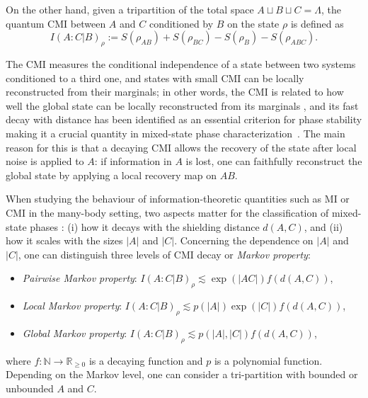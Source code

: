 \documentclass[11pt]{article}
\numberwithin{equation}{section}
\numberwithin{figure}{section}
\numberwithin{table}{section}
\theoremstyle{definition}
\theoremstyle{plain}
\theoremstyle{remark}
\newcommand{\La}{\Lambda}
\newcommand{\abs}[1]{\left \vert#1\right\vert}
\begin{document}
On the other hand, given a tripartition of the total space $A\sqcup B\sqcup C=\La$, the quantum CMI between $A$ and $C$ conditioned by $B$ on the state $\rho$ is defined as
\begin{equation}
    I(A:C|B)_\rho:=S(\rho_{AB})+S(\rho_{BC})-S(\rho_B) - S(\rho_{ABC}).
\end{equation}

The CMI measures the conditional independence of a state between two systems conditioned to a third one, and states with small CMI can be locally reconstructed from their marginals; in other words, the CMI is related to how well the global state can be locally reconstructed from its marginals \cite{Sutter2018,FawRen15}, and its fast decay with distance has been identified as an essential criterion for phase stability making it a crucial quantity in mixed-state phase characterization~\cite{Sang_2025, MKS25, yi2025universaldecayconditionalmutual, chen_quantum_2025, li_unified_2026, chen2026localreversibilitydivergentmarkov}.
The main reason for this is that a decaying CMI allows the recovery of the state after local noise is applied to $A$: if information in $A$ is lost, one can faithfully reconstruct the global state by applying a local recovery map on $AB$. 


 When studying the behaviour of information-theoretic quantities such as MI or CMI in the many-body setting, two aspects matter for the classification of mixed-state phases \cite{yi2025universaldecayconditionalmutual,ma2025circuitbasedcharacterizationfinitetemperaturequantum}: (i) how it decays with the shielding distance $d(A,C)$, and (ii) how it scales with the sizes $|A|$ and $|C|$. 
Concerning the dependence on $\abs{A}$ and $\abs{C}$, one can distinguish three levels of CMI decay or \emph{Markov property}:
\begin{itemize}
    \item \textit{Pairwise Markov property}: $I(A:C|B)_\rho \lesssim \exp(\abs{AC})f(d(A,C))$,
    \item \textit{Local Markov property}: $I(A:C|B)_\rho \lesssim p(\abs{A})\exp(\abs{C})f(d(A,C))$,
    \item \textit{Global Markov property}: $I(A:C|B)_\rho \lesssim p(\abs{A},\abs{C})f(d(A,C))$,
\end{itemize}
where $f\colon\mathbb{N}\to\mathbb{R}_{\geq 0}$ is a decaying function and $p$ is a polynomial function. Depending on the Markov level, one can consider a tri-partition with bounded or unbounded $A$ and $C$. 
\end{document}
